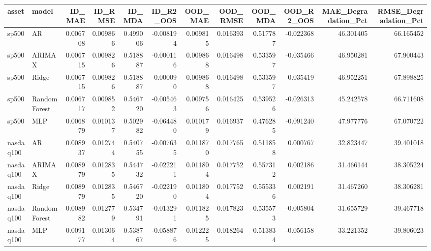 \begin{tabular}{llrrrrrrrrrr}
\toprule
asset & model & ID_MAE & ID_RMSE & ID_MDA & ID_R2_OOS & OOD_MAE & OOD_RMSE & OOD_MDA & OOD_R2_OOS & MAE_Degradation_Pct & RMSE_Degradation_Pct \\
\midrule
sp500 & AR & 0.006708 & 0.009866 & 0.499006 & -0.008194 & 0.009815 & 0.016393 & 0.517787 & -0.022368 & 46.301405 & 66.165452 \\
sp500 & ARIMAX & 0.006715 & 0.009826 & 0.518887 & -0.000116 & 0.009868 & 0.016498 & 0.533597 & -0.035466 & 46.950281 & 67.900443 \\
sp500 & Ridge & 0.006715 & 0.009826 & 0.518887 & -0.000090 & 0.009868 & 0.016498 & 0.533597 & -0.035419 & 46.952251 & 67.898825 \\
sp500 & RandomForest & 0.006717 & 0.009852 & 0.546720 & -0.005463 & 0.009756 & 0.016425 & 0.539526 & -0.026313 & 45.242578 & 66.711608 \\
sp500 & MLP & 0.006879 & 0.010137 & 0.502982 & -0.064480 & 0.010179 & 0.016937 & 0.476285 & -0.091240 & 47.977776 & 67.070722 \\
nasdaq100 & AR & 0.008937 & 0.012744 & 0.540755 & -0.007635 & 0.011870 & 0.017765 & 0.511858 & 0.000767 & 32.823447 & 39.401018 \\
nasdaq100 & ARIMAX & 0.008979 & 0.012835 & 0.544732 & -0.022211 & 0.011804 & 0.017752 & 0.557312 & 0.002186 & 31.466144 & 38.305224 \\
nasdaq100 & Ridge & 0.008979 & 0.012835 & 0.546720 & -0.022190 & 0.011804 & 0.017752 & 0.555336 & 0.002191 & 31.467260 & 38.306281 \\
nasdaq100 & RandomForest & 0.008982 & 0.012779 & 0.534791 & -0.013291 & 0.011825 & 0.017823 & 0.535573 & -0.005804 & 31.655729 & 39.467718 \\
nasdaq100 & MLP & 0.009177 & 0.013064 & 0.538767 & -0.058876 & 0.012225 & 0.018264 & 0.513834 & -0.056158 & 33.221352 & 39.806023 \\
\bottomrule
\end{tabular}

